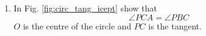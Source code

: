 \begin{enumerate}[label=\arabic*.,ref=\thesubsection.\theenumi]
%
%
%
%
%
%		
%
%
%
\item
In Fig. \ref{fig:circ_tang_icept} show that 
%
\begin{equation}
\angle PCA = \angle PBC
\end{equation}
%
$O$ is the centre of the circle and $PC$ is the tangent.
\label{them:tang_icept_ang}


\end{enumerate}
